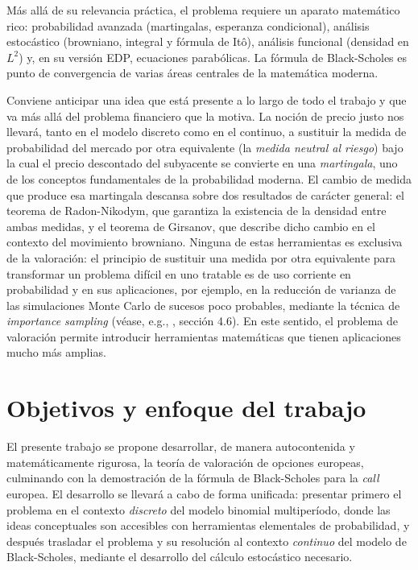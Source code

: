 \documentclass[11pt,a4paper,oneside]{report}
\theoremstyle{plain}
\theoremstyle{definition}
\theoremstyle{remark}
\newcommand{\1}{\mathbf{1}}
\begin{document}
Más allá
de su relevancia práctica, el problema requiere un aparato
matemático rico: probabilidad avanzada (martingalas, esperanza
condicional), análisis estocástico (browniano, integral y fórmula
de Itô), análisis funcional (densidad en $L^2$) y, en su versión
EDP, ecuaciones parabólicas. La fórmula de Black-Scholes es punto
de convergencia de varias áreas centrales de la matemática moderna.

Conviene
anticipar una idea que está presente a lo largo de todo el trabajo y que va más allá del
problema financiero que la motiva. La noción de precio justo nos llevará,
tanto en el modelo discreto como en el continuo, a sustituir la medida
de probabilidad del mercado por otra equivalente (la \emph{medida
neutral al riesgo}) bajo la cual el precio descontado del subyacente
se convierte en una \emph{martingala}, uno de los conceptos
fundamentales de la probabilidad moderna. El cambio de medida que
produce esa martingala descansa sobre dos resultados de carácter general:
el teorema de Radon-Nikodym, que garantiza la existencia de la densidad
entre ambas medidas, y el teorema de Girsanov, que describe dicho cambio
en el contexto del movimiento browniano. Ninguna de estas herramientas
es exclusiva de la valoración: el principio de sustituir una medida por
otra equivalente para transformar un problema difícil en uno tratable es
de uso corriente en probabilidad y en sus aplicaciones, por ejemplo,
en la reducción de varianza de las simulaciones Monte Carlo de sucesos
poco probables, mediante la técnica de \emph{importance sampling}
(véase, e.g., \cite{glasserman}, sección 4.6). En este sentido, el problema de valoración permite introducir herramientas matemáticas que tienen aplicaciones mucho más amplias.

\section{Objetivos y enfoque del trabajo}
\label{sec:objetivos}

El presente trabajo se propone desarrollar, de manera autocontenida y
matemáticamente rigurosa, la teoría de valoración de opciones
europeas, culminando con la demostración de la fórmula de
Black-Scholes para la \emph{call} europea. El desarrollo se llevará a cabo de forma unificada: presentar primero el problema en el
contexto \emph{discreto} del modelo binomial multiperíodo, donde las
ideas conceptuales son accesibles con herramientas elementales de
probabilidad, y después trasladar el problema y su resolución
al contexto \emph{continuo} del modelo de Black-Scholes, mediante el
desarrollo del cálculo estocástico necesario.
\end{document}
